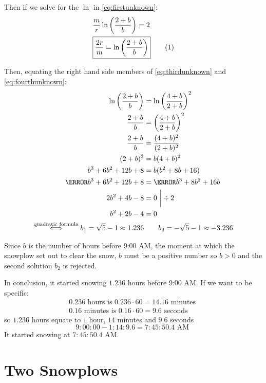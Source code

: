 \documentclass[a4paper,12pt]{article}
\renewcommand*{\textnormal}[1]{\text{ #1 }}
\newcommand\numberthis{\addtocounter{equation}{1}\tag{\theequation}}
\begin{document}
    Then if we solve for the $\ln$ in \eqref{eq:firstunknown}:
    \begin{align*}
        &\frac{m}{r} \ln\left(\frac{2+b}{b}\right) = 2 \\
        &\boxed{\frac{2r}{m} = \ln\left(\frac{2+b}{b}\right)} \numberthis \label{eq:fourthunknown}
    \end{align*}

    Then, equating the right hand side members of \eqref{eq:thirdunknown} and \eqref{eq:fourthunknown}:
    \begin{align*}
        \ln\left(\frac{2+b}{b}\right) &= \ln\left(\frac{4+b}{2+b}\right)^2 \\
        \frac{2+b}{b} &= \left(\frac{4+b}{2+b}\right)^2 \\
        \frac{2+b}{b} &= \frac{(4+b)^2}{(2+b)^2} \\
        (2+b)^3 &= b(4+b)^2 \\
        b^3 + 6b^2 + 12b + 8 &= b (b^2 + 8b + 16) \\
        \cancel{b^3} + 6b^2 + 12b + 8 &= \cancel{b^3} + 8b^2 + 16b \\
         2b^2 +  4b - 8 &= 0 \ \bigg| \div 2 \\ 
         b^2 + 2b - 4 &= 0 \\
         \overset{\text{quadratic formula}}{\iff} b_1 = \sqrt{5} - 1 \approx 1.236 &\qquad b_2 = -\sqrt 5 - 1 \approx - 3.236
    \end{align*}

    Since $b$ is the number of hours before 9:00 AM, the moment at which the snowplow set out to clear the snow, $b$ must be a positive number so $b >0$ and the second solution $b_2$ is rejected.

    In conclusion, it started snowing $1.236$ hours before 9:00 AM. If we want to be specific:
    \begin{align*}
        0.236 \textnormal{hours is} 0.236 \cdot 60 = 14.16 \textnormal{minutes} \\
        0.16 \textnormal{minutes is} 0.16 \cdot 60 = 9.6 \textnormal{seconds}
    \end{align*}
    so $1.236$ hours equate to $1$ hour, $14$ minutes and $9.6$ seconds
    \[
        9{:}00{:}00 - 1{:}14{:}9.6 = 7{:}45{:}50.4 \textnormal{AM}
    \]
   It started snowing at $7{:}45{:}50.4$ AM.

\part{Two Snowplows}
\end{document}
